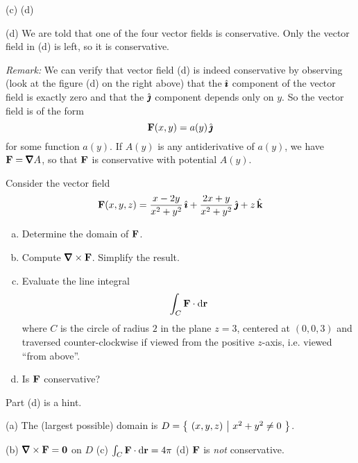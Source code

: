 \begin{solution}
\begin{center}
      (c) \qquad
      (d) \qquad
\end{center}


(d) We are told that one of the four vector fields is
conservative. Only the vector field in (d) is left, so it is
conservative. 

\emph{Remark:}
We can verify that vector field (d) is indeed conservative 
by observing (look at the figure (d) on the right above)
that the $\hat{\pmb{\imath}}$ component of the vector field is exactly 
zero and that the $\hat{\pmb{\jmath}}$  component depends only on $y$. So the 
vector field is of the form 
\begin{equation*}
\mathbf{F}(x,y) = a(y)\,\hat{\pmb{\jmath}}
\end{equation*}
for some function $a(y)$.
If $A(y)$ is any antiderivative of $a(y)$, we have $\vF=\vnabla A$,
so that $\mathbf{F}$ is conservative with potential $A(y)$.
\end{solution}


\begin{question}[M317 2007A] %
Consider the vector field
\begin{equation*}
\mathbf{F}(x, y, z) = \frac{x-2y}{x^2+y^2}\,\hat{\pmb{\imath}}
              +\frac{2x + y}{x^2+y^2}\,\hat{\pmb{\jmath}}
              + z\,\hat{\mathbf{k}}
\end{equation*}
\begin{enumerate}[(a)]
\item
Determine the domain of $\mathbf{F}$.
\item
Compute $\vnabla \times \vF$. Simplify the result.
\item
Evaluate the line integral
\begin{equation*}
\int_C \mathbf{F} \cdot \mathrm{d}\mathbf{r}
\end{equation*}
where $C$ is the circle of radius $2$ in the plane $z = 3$, 
centered at $(0, 0, 3)$ and traversed counter-clockwise if 
viewed from the positive $z$-axis, i.e. viewed ``from above''.
\item
Is $\mathbf{F}$ conservative?
\end{enumerate}
\end{question}

\begin{hint} 
Part (d) is a hint.
\end{hint}

\begin{answer} 
(a) The (largest possible) domain is $D=\big\{ \ (x,y,z)\ \big|\ x^2+y^2\ne 0\ \big\}$.

(b) $\vnabla\times\vF=\vZero$ on $D$\qquad
(c) $\int_C \mathbf{F} \cdot \mathrm{d}\mathbf{r}=4\pi$\qquad
(d) $\mathbf{F}$ is \emph{not} conservative.
\end{answer}

